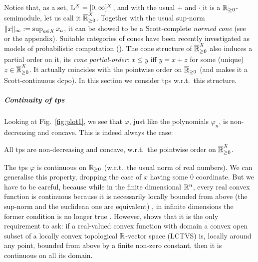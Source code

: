 %
Notice that, as a set, $\mathbb{L}^X=[0,\infty]^X$, and with the usual $+$ and $\cdot$ it is a $\mathbb{R}_{\geq0}$-semimodule, let us call it $\overline{\mathbb{R}}_{\geq 0}^X$.
Together with the usual sup-norm $\lVert x\rVert_\infty:=\sup_{a\in X} x_a$, it can be showed to be a Scott-complete \emph{normed cone} (see~\cite{Selinger2004} or the appendix).
Suitable categories of cones have been recently investigated as models of probabilistic computation (\cite{Crubillie2018, EhrPagTas2018, Ehrhard2020}).
The cone structure of $\overline{\mathbb{R}}_{\geq 0}^X$ also induces a partial order on it, its \emph{cone partial-order}:
$x\leq y$ iff $y=x+z$ for some (unique) $z\in\overline{\mathbb{R}}_{\geq 0}^X$.
It actually coincides with the pointwise order on $\overline{\mathbb{R}}_{\geq 0}$ (and makes it a Scott-continuous dcpo).
In this section we consider tps w.r.t.\ this structure.

\subparagraph*{Continuity of tps}\label{subsec:cont}%

Looking at Fig.~\ref{fig:plot1}, we see that $\varphi$, just like the polynomials $\varphi_{n}$, is non-decreasing and concave.
This is indeed always the case:

\begin{proposition}\label{prop:nondecr+conc}
 All tps 
are non-decreasing and concave, w.r.t.\ the pointwise order on $\overline{\mathbb{R}}_{\geq 0}^{X}$.
\end{proposition}


The tps $\varphi$ is continuous on $\mathbb{R}_{\geq0}$ (w.r.t.\ the usual norm of real numbers).
We can generalise this property, dropping the case of $x$ having some $0$ coordinate.
But we have to be careful, because while in the finite dimensional $\mathbb{R}^n$, every real convex function is continuous because it is necessarily locally bounded from above (the sup-norm and the euclidean one are equivalent) \cite[Proposition 4.7]{Cobzas2017}, in infinite dimensions the former condition is no longer true \cite[Example 4.8]{Cobzas2017}.
However, \cite[Proposition 4.4.(3)]{Cobzas2017} shows that it is the only requirement to ask: if a real-valued convex function with domain a convex open subset of a locally convex topological $\mathbb{R}$-vector space (LCTVS) is, locally around any point, bounded from above by a finite non-zero constant, then it is continuous on all its domain.

